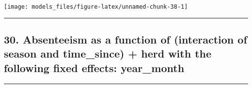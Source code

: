\documentclass[]{article}
\begin{document}
\begin{center}\texttt{[image: models\_files/figure-latex/unnamed-chunk-38-1]} \end{center}

\newpage

\begin{center}\rule{0.5\linewidth}{\linethickness}\end{center}

\subsection{30. Absenteeism as a function of (interaction of season and
time\_since) + herd with the following fixed effects:
year\_month}\label{absenteeism-as-a-function-of-interaction-of-season-and-time_since-herd-with-the-following-fixed-effects-year_month}

\begin{center}\rule{0.5\linewidth}{\linethickness}\end{center}
\end{document}
